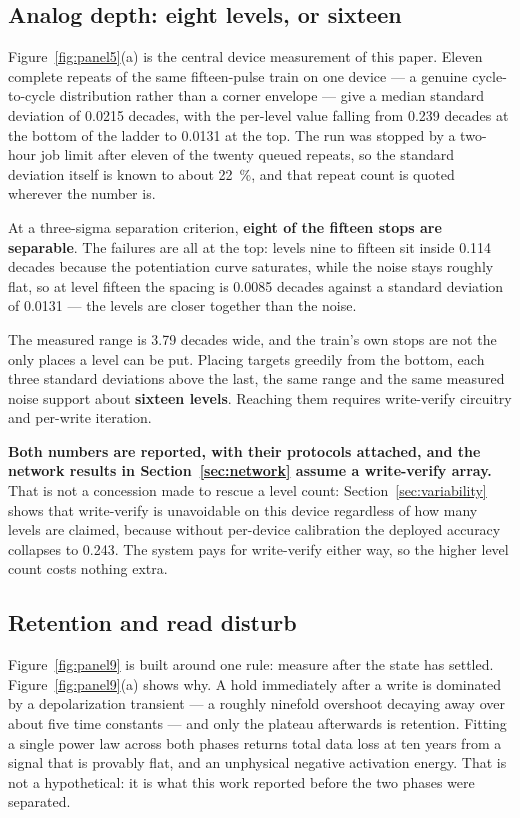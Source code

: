 \subsection{Analog depth: eight levels, or sixteen}
\label{sec:levels}

Figure~\ref{fig:panel5}(a) is the central device measurement of this paper. Eleven complete repeats of
the same fifteen-pulse train on one device --- a genuine cycle-to-cycle distribution
rather than a corner envelope --- give a median standard deviation of \num{0.0215}
decades, with the per-level value falling from \num{0.239} decades at the bottom of the
ladder to \num{0.0131} at the top. The run was stopped by a two-hour job limit after
eleven of the twenty queued repeats, so the standard deviation itself is known to about
\SI{22}{\percent}, and that repeat count is quoted wherever the number is.

At a three-sigma separation criterion, \textbf{eight of the fifteen stops are separable}.
The failures are all at the top: levels nine to fifteen sit inside \num{0.114} decades
because the potentiation curve saturates, while the noise stays roughly flat, so at level
fifteen the spacing is \num{0.0085} decades against a standard deviation of \num{0.0131}
--- the levels are closer together than the noise.

The measured range is \num{3.79} decades wide, and the train's own stops are not the only
places a level can be put. Placing targets greedily from the bottom, each three standard
deviations above the last, the same range and the same measured noise support about
\textbf{sixteen levels}. Reaching them requires write-verify circuitry and per-write
iteration.

\textbf{Both numbers are reported, with their protocols attached, and the network results
in Section~\ref{sec:network} assume a write-verify array.} That is not a concession made
to rescue a level count: Section~\ref{sec:variability} shows that write-verify is
unavoidable on this device regardless of how many levels are claimed, because without
per-device calibration the deployed accuracy collapses to \num{0.243}. The system pays
for write-verify either way, so the higher level count costs nothing extra.

\subsection{Retention and read disturb}

Figure~\ref{fig:panel9} is built around one rule: measure after the state has settled. Figure~\ref{fig:panel9}(a) shows
why. A hold immediately after a write is dominated by a depolarization transient --- a
roughly ninefold overshoot decaying away over about five time constants --- and only the
plateau afterwards is retention. Fitting a single power law across both phases returns
total data loss at ten years from a signal that is provably flat, and an unphysical
negative activation energy. That is not a hypothetical: it is what this work reported
before the two phases were separated.

